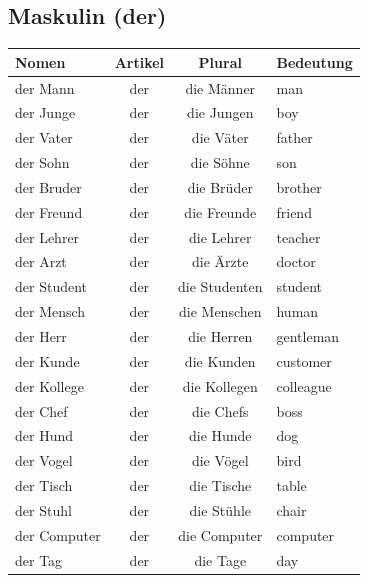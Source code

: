 \subsection{Maskulin (der)}
\begin{center}
\begin{tabular}{|l|c|c|l|}
\hline
\textbf{Nomen} & \textbf{Artikel} & \textbf{Plural} & \textbf{Bedeutung} \\ \hline
der Mann & der & die Männer & man \\ \hline
der Junge & der & die Jungen & boy \\ \hline
der Vater & der & die Väter & father \\ \hline
der Sohn & der & die Söhne & son \\ \hline
der Bruder & der & die Brüder & brother \\ \hline
der Freund & der & die Freunde & friend \\ \hline
der Lehrer & der & die Lehrer & teacher \\ \hline
der Arzt & der & die Ärzte & doctor \\ \hline
der Student & der & die Studenten & student \\ \hline
der Mensch & der & die Menschen & human \\ \hline
der Herr & der & die Herren & gentleman \\ \hline
der Kunde & der & die Kunden & customer \\ \hline
der Kollege & der & die Kollegen & colleague \\ \hline
der Chef & der & die Chefs & boss \\ \hline
der Hund & der & die Hunde & dog \\ \hline
der Vogel & der & die Vögel & bird \\ \hline
der Tisch & der & die Tische & table \\ \hline
der Stuhl & der & die Stühle & chair \\ \hline
der Computer & der & die Computer & computer \\ \hline
der Tag & der & die Tage & day \\ \hline
\end{tabular}
\end{center}

